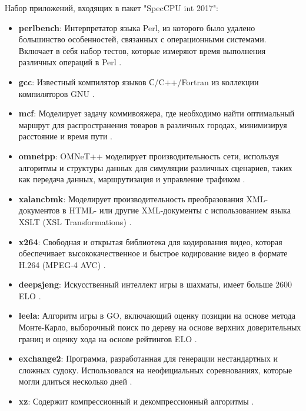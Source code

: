 Набор приложений, входящих в пакет "SpecCPU int 2017":
\begin{itemize}
		\item  \textbf{perlbench}:  Интерпретатор языка Perl, из которого было удалено большинство особенностей, связанных с операционными системами. Включает в себя набор тестов, которые измеряют время выполнения различных операций в Perl \cite{siever1998perl}.
		\item  \textbf{gcc}: Известный компилятор языков С/C++/Fortran из коллекции компиляторов GNU \cite{gough2004introduction}. 
		\item  \textbf{mcf}: Моделирует задачу коммивояжера, где необходимо найти оптимальный маршрут для распространения товаров в различных городах, минимизируя расстояние и время пути \cite{lobel1999solving}.
		\item  \textbf{omnetpp}: OMNeT++ моделирует производительность  сети, используя алгоритмы и структуры данных для симуляции различных сценариев, таких как передача данных, маршрутизация и управление трафиком \cite{varga2019practical}.
		\item  \textbf{xalancbmk}: Моделирует производительность преобразования XML-документов в HTML- или другие XML-документы с использованием языка XSLT (XSL Transformations) \cite{euzenat2002xml}.
		\item  \textbf{x264}: Свободная и открытая библиотека для кодирования видео, которая обеспечивает высококачественное и быстрое кодирование видео в формате H.264 (MPEG-4 AVC) \cite{merritt2006x264}.
		\item  \textbf{deepsjeng}: Искусственный интеллект игры в шахматы, имеет больше 2600 ELO  \cite{sandin2021ssdf}.
		\item  \textbf{leela}: Алгоритм игры в GO, включающий оценку позиции на основе метода Монте-Карло, выборочный поиск по дереву на основе верхних доверительных границ и оценку хода на основе рейтингов ELO \cite{choi2022does} .
		\item  \textbf{exchange2}: Программа, разработанная для генерации нестандартных и сложных судоку. Использовался на неофициальных соревнованиях, которые могли длиться несколько дней \cite{10.1145/1124708.1124709}. 
		\item  \textbf{xz}: Содержит компрессионный и декомпрессионный алгоритмы \cite{koranne2011compression}. 
\end{itemize}

